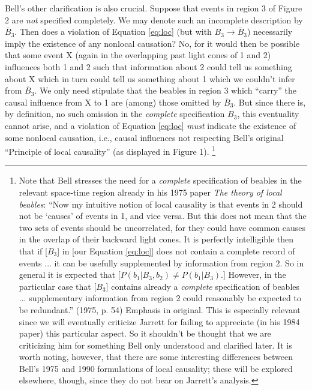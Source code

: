 \documentclass[aps,prc,twocolumn]{revtex4}
\begin{document}
Bell's other clarification is also crucial.  Suppose that events in
region 3 of Figure 2 are \emph{not} specified completely.  We may
denote such an incomplete description by $\bar{B}_3$.  Then does a
violation of Equation \ref{eq:loc} (but with $B_3 \rightarrow \bar{B}_3$)
necessarily imply the existence of any nonlocal causation?  No, for it
would then be possible that some event X (again in the overlapping past
light cones of 1 and 2) influences both 1 and 2 such that
information about 2 could tell us something about X which in turn
could tell us something about 1 which we couldn't infer from $\bar{B}_3$.
We only need stipulate that the beables in region 3 which ``carry''
the causal influence from X to 1 are (among) those omitted by $\bar{B}_3$.
But since there is, by definition, no such omission in the \emph{complete}
specification $B_3$, this eventuality cannot arise, and a violation of
Equation \ref{eq:loc} \emph{must} indicate the existence of some
nonlocal causation, i.e., causal influences not respecting Bell's
original ``Principle of local causality'' (as displayed in Figure 1).  
\footnote{Note that Bell stresses the need for a \emph{complete}
specification of beables in the relevant space-time region already
in his 1975 paper \emph{The theory of local beables}:  
``Now my intuitive notion of local causality is
that events in 2 should not be `causes' of events in 1, and vice
versa.  But this does not mean that the two sets of events should be
uncorrelated, for they could have common causes in the overlap of
their backward light cones.  It is perfectly intelligible then that if
[$B_3$] in [our Equation \ref{eq:loc}] 
does not contain a complete record of events ... it
can be usefully supplemented by information from region 2.  So in
general it is expected that [$P(b_1|B_3,b_2) \ne P(b_1|B_3)$.]
However, in the particular case that [$B_3$] contains already a
\emph{complete} specification of beables ... supplementary information
from region 2 could reasonably be expected to be redundant.'' 
(1975, p. 54)  Emphasis in original.  
This is especially relevant since we will eventually criticize
Jarrett for failing to appreciate (in his 1984 paper) this particular 
aspect.  So it shouldn't be thought that we are criticizing him for 
something Bell only understood and clarified later.  It is worth
noting, however, that there are some interesting differences between
Bell's 1975 and 1990 formulations of local causality; these will be
explored elsewhere, though, since they do not bear on Jarrett's analysis.}
\end{document}
